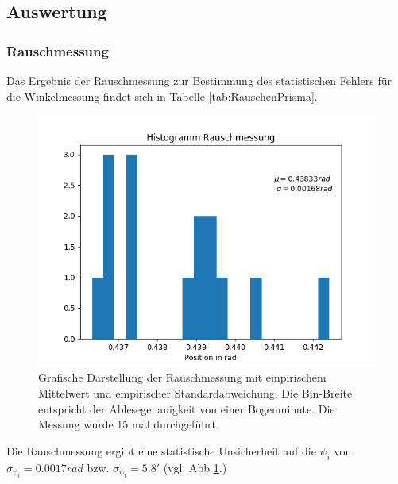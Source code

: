 \documentclass[12pt,a4paper]{article}
\begin{document}
\subsection{Auswertung}

\subsubsection{Rauschmessung}

Das Ergebnis der Rauschmessung zur Bestimmung des statistischen Fehlers für die Winkelmessung findet sich in Tabelle \ref{tab:RauschenPrisma}.

\begin{figure}
\includegraphics[scale=1.0]{Bilder/HistRauschen.png}
\caption{Grafische Darstellung der Rauschmessung mit empirischem Mittelwert und empirischer Standardabweichung. Die Bin-Breite entspricht der Ablesegenauigkeit von einer Bogenminute. Die Messung wurde 15 mal durchgeführt.}
\label{fig:HistRauschen}
\end{figure}

Die Rauschmessung ergibt eine statistische Unsicherheit auf die $\psi_i$ von $\sigma_{\psi_i} = 0.0017 rad$ bzw. $\sigma_{\psi_i} = 5.8'$ (vgl. Abb \ref{fig:HistRauschen}.)
\end{document}
